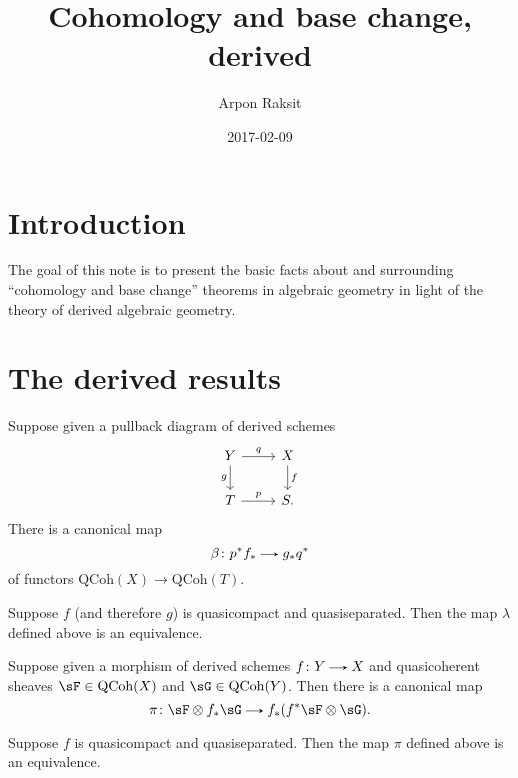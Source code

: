 


\title{Cohomology and base change, derived}
\author{Arpon Raksit}
\date{2017-02-09}



\maketitle

\newcommand{\QCoh}{\mathrm{QCoh}}


\addtocounter{section}{-1}
\section{Introduction}

The goal of this note is to present the basic facts about and surrounding ``cohomology and base change'' theorems in algebraic geometry in light of the theory of derived algebraic geometry.


\section{The derived results}

\begin{nothing}
  \label{derived-base-change}
  Suppose given a pullback diagram of derived schemes
  \[
    \begin{tikzcd}
      Y \ar[r, "q"] \ar[d, "g", swap] &
      X \ar[d, "f"] \\
      T \ar[r, "p"] &
      S.
    \end{tikzcd}
  \]
  There is a canonical map
  \[
    \beta \c p^*f_* \to g_*q^*
  \]
  of functors $\QCoh(X) \to \QCoh(T)$.

  \begin{subclaim}
    \label{derived-base-change-equivalence}
    Suppose $f$ (and therefore $g$) is quasicompact and quasiseparated. Then the map $\lambda$ defined above is an equivalence.
  \end{subclaim}
\end{nothing}

\begin{nothing}
  \label{derived-projection}
  Suppose given a morphism of derived schemes $f \c Y \to X$ and quasicoherent sheaves $\sF \in \QCoh(X)$ and $\sG \in \QCoh(Y)$. Then there is a canonical map
  \[
    \pi \c \sF \otimes f_*\sG \to f_*(f^*\sF \otimes \sG).
  \]

  \begin{subclaim}
    \label{derived-projection-formula}
    Suppose $f$ is quasicompact and quasiseparated. Then the map $\pi$ defined above is an equivalence.
  \end{subclaim}
\end{nothing}

